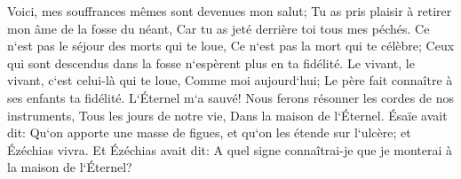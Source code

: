 \verse Voici, mes souffrances mêmes sont devenues mon salut; Tu as pris plaisir à retirer mon âme de la fosse du néant, Car tu as jeté derrière toi tous mes péchés. 
\verse Ce n`est pas le séjour des morts qui te loue, Ce n`est pas la mort qui te célèbre; Ceux qui sont descendus dans la fosse n`espèrent plus en ta fidélité. 
\verse Le vivant, le vivant, c`est celui-là qui te loue, Comme moi aujourd`hui; Le père fait connaître à ses enfants ta fidélité. 
\verse L`Éternel m`a sauvé! Nous ferons résonner les cordes de nos instruments, Tous les jours de notre vie, Dans la maison de l`Éternel. 
\verse Ésaïe avait dit: Qu`on apporte une masse de figues, et qu`on les étende sur l`ulcère; et Ézéchias vivra. 
\verse Et Ézéchias avait dit: A quel signe connaîtrai-je que je monterai à la maison de l`Éternel? 

\chapter{}

